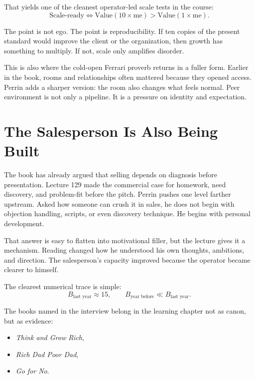 \documentclass[11pt,oneside]{book}
\begin{document}
That yields one of the cleanest operator-led scale tests in the course:
\begin{equation}
\text{Scale-ready}
\iff
\text{Value}(10\times \text{me})>\text{Value}(1\times \text{me}).
\end{equation}

The point is not ego. The point is reproducibility. If ten copies of the present standard would improve the client or the organization, then growth has something to multiply. If not, scale only amplifies disorder.

This is also where the cold-open Ferrari proverb returns in a fuller form. Earlier in the book, rooms and relationships often mattered because they opened access. Perrin adds a sharper version: the room also changes what feels normal. Peer environment is not only a pipeline. It is a pressure on identity and expectation.

\section{The Salesperson Is Also Being Built}

The book has already argued that selling depends on diagnosis before presentation. Lecture 129 made the commercial case for homework, need discovery, and problem-fit before the pitch. Perrin pushes one level farther upstream. Asked how someone can crush it in sales, he does not begin with objection handling, scripts, or even discovery technique. He begins with personal development.

That answer is easy to flatten into motivational filler, but the lecture gives it a mechanism. Reading changed how he understood his own thoughts, ambitions, and direction. The salesperson's capacity improved because the operator became clearer to himself.

The clearest numerical trace is simple:
\begin{equation}
B_{\text{last year}} \approx 15,
\qquad
B_{\text{year before}} \ll B_{\text{last year}}.
\end{equation}

The books named in the interview belong in the learning chapter not as canon, but as evidence:
\begin{itemize}
\item \textit{Think and Grow Rich},
\item \textit{Rich Dad Poor Dad},
\item \textit{Go for No}.
\end{itemize}
\end{document}
